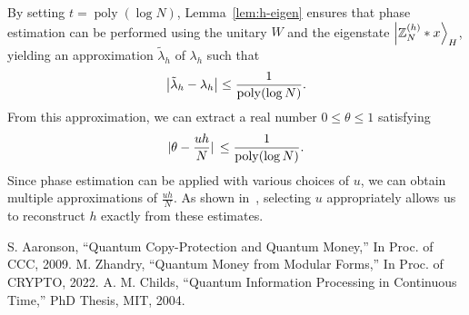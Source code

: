 \documentclass[12pt]{report}
\begin{document}
    By setting \( t = \operatorname{poly}(\log N) \), Lemma~\ref{lem:h-eigen} ensures that phase estimation can be performed using the unitary \( W \) and the eigenstate \( \ket{\mathbb{Z}_N^{(h)} * x}_H \), yielding an approximation \( \tilde{\lambda}_h \) of \( \lambda_h \) such that
    \[
    \abs{\tilde{\lambda}_h - \lambda_h} \le \frac{1}{\operatorname{poly}(\log N)}.
    \]
    From this approximation, we can extract a real number \( 0 \le \theta \le 1 \) satisfying
    \[
    \abs*{\theta - \frac{uh}{N}} \le \frac{1}{\operatorname{poly}(\log N)}.
    \]
    Since phase estimation can be applied with various choices of \( u \), we can obtain multiple approximations of \( \frac{uh}{N} \). As shown in~\cite{zhandry2024quantum}, selecting \( u \) appropriately allows us to reconstruct \( h \) exactly from these estimates.







\begin{thebibliography}{99}
 S. Aaronson, ``Quantum Copy-Protection and Quantum Money,'' In Proc. of CCC, 2009.
 M. Zhandry, ``Quantum Money from Modular Forms,'' In Proc. of CRYPTO, 2022.
 A. M. Childs, ``Quantum Information Processing in Continuous Time,'' PhD Thesis, MIT, 2004.
\end{thebibliography}
\end{document}
